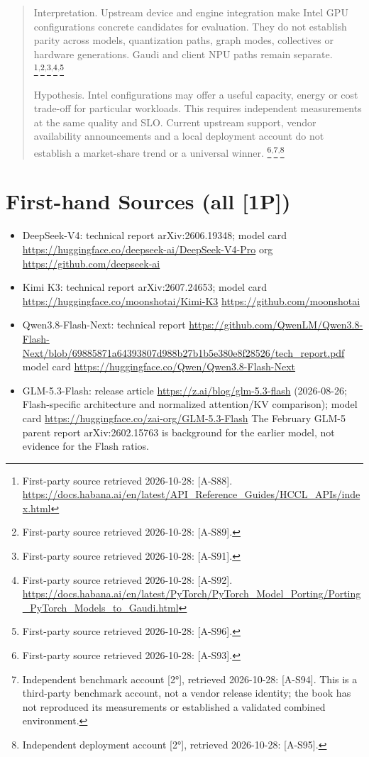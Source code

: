 \begin{quote}
Interpretation. Upstream device and engine integration make Intel GPU
configurations concrete candidates for evaluation. They do not establish
parity across models, quantization paths, graph modes, collectives or
hardware generations. Gaudi and client NPU paths remain separate.
\footnote{First-party source retrieved 2026-10-28: \mbox{{[}A-S88{]}}.
  \url{https://docs.habana.ai/en/latest/API_Reference_Guides/HCCL_APIs/index.html}}\textsuperscript{,}\footnote{First-party
  source retrieved 2026-10-28: \mbox{{[}A-S89{]}}.}\textsuperscript{,}\footnote{First-party
  source retrieved 2026-10-28: \mbox{{[}A-S91{]}}.}\textsuperscript{,}\footnote{First-party
  source retrieved 2026-10-28: \mbox{{[}A-S92{]}}.
  \url{https://docs.habana.ai/en/latest/PyTorch/PyTorch_Model_Porting/Porting_PyTorch_Models_to_Gaudi.html}}\textsuperscript{,}\footnote{First-party
  source retrieved 2026-10-28: \mbox{{[}A-S96{]}}.}

Hypothesis. Intel configurations may offer a useful capacity, energy or
cost trade-off for particular workloads. This requires independent
measurements at the same quality and SLO. Current upstream support,
vendor availability announcements and a local deployment account do not
establish a market-share trend or a universal winner.
\footnote{First-party source retrieved 2026-10-28: \mbox{{[}A-S93{]}}.}\textsuperscript{,}\footnote{Independent
  benchmark account \mbox{{[}2°{]}}, retrieved 2026-10-28: \mbox{{[}A-S94{]}}. This is
  a third-party benchmark account, not a vendor release identity; the
  book has not reproduced its measurements or established a validated
  combined environment.}\textsuperscript{,}\footnote{Independent
  deployment account \mbox{{[}2°{]}}, retrieved 2026-10-28: \mbox{{[}A-S95{]}}.}
\end{quote}

\section{First-hand Sources (all
\mbox{{[}1P{]}})}\label{first-hand-sources-all-1p}

\begin{itemize}
\tightlist
\item
  DeepSeek-V4: technical report arXiv:2606.19348; model card
  \url{https://huggingface.co/deepseek-ai/DeepSeek-V4-Pro} org
  \url{https://github.com/deepseek-ai}
\item
  Kimi K3: technical report arXiv:2607.24653; model card
  \url{https://huggingface.co/moonshotai/Kimi-K3}
  \url{https://github.com/moonshotai}
\item
  Qwen3.8-Flash-Next: technical report
  \url{https://github.com/QwenLM/Qwen3.8-Flash-Next/blob/69885871a64393807d988b27b1b5e380e8f28526/tech_report.pdf}
  model card \url{https://huggingface.co/Qwen/Qwen3.8-Flash-Next}
\item
  GLM-5.3-Flash: release article \url{https://z.ai/blog/glm-5.3-flash}
  (2026-08-26; Flash-specific architecture and normalized attention/KV
  comparison); model card \url{https://huggingface.co/zai-org/GLM-5.3-Flash}
  The February GLM-5 parent report arXiv:2602.15763 is background for
  the earlier model, not evidence for the Flash ratios.
\end{itemize}

